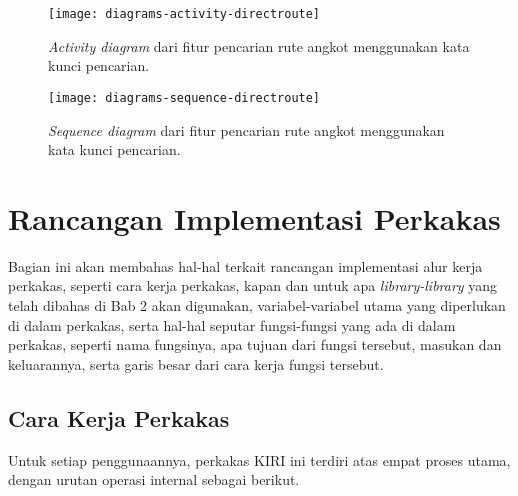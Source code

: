 \begin{figure}[h]
    \centering
    \texttt{[image: diagrams-activity-directroute]}
    \caption[\textit{Activity diagram} fitur pencarian rute angkot menggunakan kata kunci lokasi]{\textit{Activity diagram} dari fitur pencarian rute angkot menggunakan kata kunci pencarian.}
    \label{fig:diagrams-activity-directroute}
\end{figure}

\begin{figure}[h]
    \centering
    \texttt{[image: diagrams-sequence-directroute]}
    \caption[\textit{Sequence diagram} fitur pencarian rute angkot menggunakan kata kunci lokasi]{\textit{Sequence diagram} dari fitur pencarian rute angkot menggunakan kata kunci pencarian.}
    \label{fig:diagrams-sequence-directroute}
\end{figure}

\section{Rancangan Implementasi Perkakas}
\label{sec:design-implementation}

Bagian ini akan membahas hal-hal terkait rancangan implementasi alur kerja perkakas, seperti cara kerja perkakas, kapan dan untuk apa \textit{library-library} yang telah dibahas di Bab 2 akan digunakan, variabel-variabel utama yang diperlukan di dalam perkakas, serta hal-hal seputar fungsi-fungsi yang ada di dalam perkakas, seperti nama fungsinya, apa tujuan dari fungsi tersebut, masukan dan keluarannya, serta garis besar dari cara kerja fungsi tersebut.
\newpage\vspace*{-3.5em} %
\subsection{Cara Kerja Perkakas}
\label{sec:design-implementation-overview}

Untuk setiap penggunaannya, perkakas \cl\xspace KIRI ini terdiri atas empat proses utama, dengan urutan operasi internal sebagai berikut.

